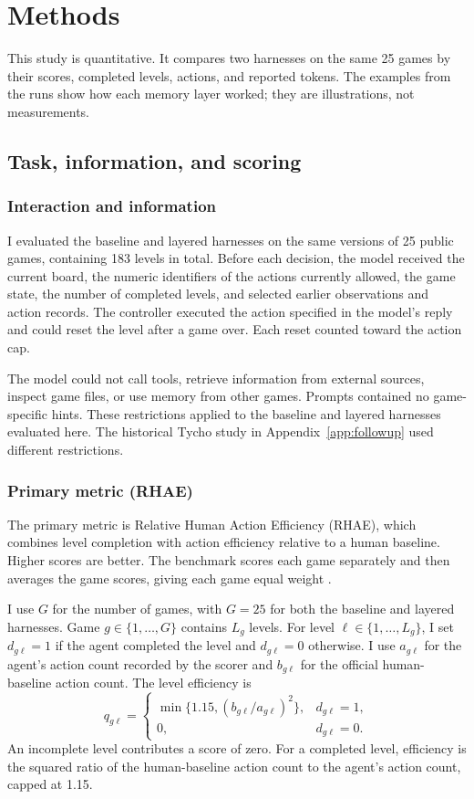 \section{Methods}\label{sec:methods}
This study is quantitative. It compares two harnesses on the same 25 games by their scores, completed levels, actions, and reported tokens. The examples from the runs show how each memory layer worked; they are illustrations, not measurements.

\subsection{Task, information, and scoring}
\subsubsection{Interaction and information}
I evaluated the baseline and layered harnesses on the same versions of 25 public games, containing 183 levels in total. Before each decision, the model received the current board, the numeric identifiers of the actions currently allowed, the game state, the number of completed levels, and selected earlier observations and action records. The controller executed the action specified in the model's reply and could reset the level after a game over. Each reset counted toward the action cap.


The model could not call tools, retrieve information from external sources, inspect game files, or use memory from other games. Prompts contained no game-specific hints. These restrictions applied to the baseline and layered harnesses evaluated here. The historical Tycho study in Appendix~\ref{app:followup} used different restrictions.


\subsubsection{Primary metric (RHAE)}
The primary metric is Relative Human Action Efficiency (RHAE), which combines level completion with action efficiency relative to a human baseline. Higher scores are better. The benchmark scores each game separately and then averages the game scores, giving each game equal weight \citep{arc2026scoring}.

I use $G$ for the number of games, with $G=25$ for both the baseline and layered harnesses. Game $g\in\{1,\ldots,G\}$ contains $L_g$ levels. For level $\ell\in\{1,\ldots,L_g\}$, I set $d_{g\ell}=1$ if the agent completed the level and $d_{g\ell}=0$ otherwise. I use $a_{g\ell}$ for the agent's action count recorded by the scorer and $b_{g\ell}$ for the official human-baseline action count. The level efficiency is
\begin{equation}
q_{g\ell}=\begin{cases}
\min\{1.15,(b_{g\ell}/a_{g\ell})^2\},&d_{g\ell}=1,\\
0,&d_{g\ell}=0.
\end{cases}\label{eq:level}
\end{equation}
An incomplete level contributes a score of zero. For a completed level, efficiency is the squared ratio of the human-baseline action count to the agent's action count, capped at 1.15.

